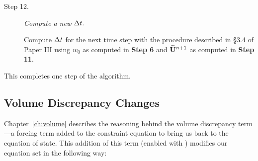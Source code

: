 \begin{description}
\item[Step 12.] {\em Compute a new $\Delta t.$}

Compute $\Delta t$ for the next time step with the procedure described in
\S 3.4 of Paper III using $w_0$ as computed in {\bf Step 6} and $\widetilde{{\bf U}}^{n+1}$
as computed in {\bf Step 11}.

\end{description}

\noindent This completes one step of the algorithm.



\subsection{Volume Discrepancy Changes}

Chapter~\ref{ch:volume} describes the reasoning behind the volume discrepancy
term---a forcing term added to the constraint equation to bring us back to
the equation of state.  This addition of this term (enabled with ) modifies our
equation set in the following way:

